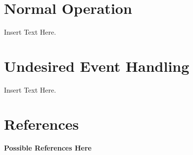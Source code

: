 \documentclass [10pt]{article}
\begin{document}
%
%
%
%
%
%
%
%
%



\section{Normal Operation}
Insert Text Here. 


\section{Undesired Event Handling}
Insert Text Here. 



\section{References}
\textbf{Possible References Here}

\end{document}
